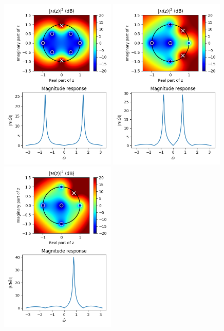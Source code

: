     \begin{figure}
        \begin{center}
            \includegraphics[width=0.49\textwidth]{code/026_iir/ex5.png}
            \includegraphics[width=0.49\textwidth]{code/026_iir/ex6.png}
            \includegraphics[width=0.49\textwidth]{code/026_iir/ex7.png}

\end{center}
\end{figure}
